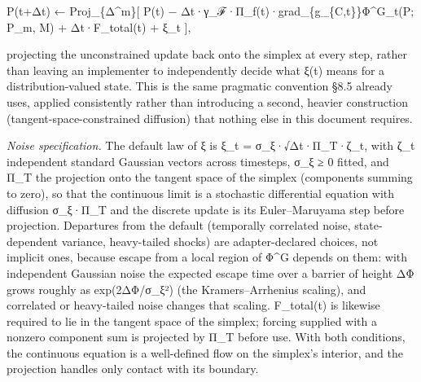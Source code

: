 \documentclass[
]{article}
\begin{document}
P(t+Δt) ← Proj\_\{Δ\^{}m\}{[} P(t) −
Δt·γ\_ℱ·Π\_f(t)·grad\_\{g\_\{C,t\}\}Φ\^{}G\_t(P; P\_m, M) +
Δt·F\_total(t) + ξ\_t {]},

projecting the unconstrained update back onto the simplex at every step,
rather than leaving an implementer to independently decide what ξ(t)
means for a distribution-valued state. This is the same pragmatic
convention §8.5 already uses, applied consistently rather than
introducing a second, heavier construction (tangent-space-constrained
diffusion) that nothing else in this document requires.

\emph{Noise specification.} The default law of ξ is ξ\_t =
σ\_ξ·√Δt·Π\_T·ζ\_t, with ζ\_t independent standard Gaussian vectors
across timesteps, σ\_ξ ≥ 0 fitted, and Π\_T the projection onto the
tangent space of the simplex (components summing to zero), so that the
continuous limit is a stochastic differential equation with diffusion
σ\_ξ·Π\_T and the discrete update is its Euler--Maruyama step before
projection. Departures from the default (temporally correlated noise,
state-dependent variance, heavy-tailed shocks) are adapter-declared
choices, not implicit ones, because escape from a local region of Φ\^{}G
depends on them: with independent Gaussian noise the expected escape
time over a barrier of height ΔΦ grows roughly as exp(2ΔΦ/σ\_ξ²) (the
Kramers--Arrhenius scaling), and correlated or heavy-tailed noise
changes that scaling. F\_total(t) is likewise required to lie in the
tangent space of the simplex; forcing supplied with a nonzero component
sum is projected by Π\_T before use. With both conditions, the
continuous equation is a well-defined flow on the simplex's interior,
and the projection handles only contact with its boundary.
\end{document}
